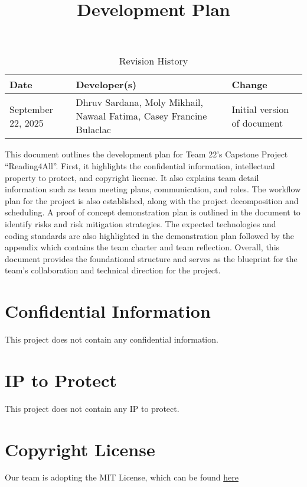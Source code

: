 \documentclass{article}
\title{Development Plan\\\progname}
\author{\authname}
\date{}
\begin{document}
\maketitle

\begin{table}[hp]
\caption{Revision History} \label{TblRevisionHistory}
\begin{tabularx}{\textwidth}{lXl}
\toprule
\textbf{Date} & \textbf{Developer(s)} & \textbf{Change}\\
\midrule
September 22, 2025 & Dhruv Sardana, Moly Mikhail, Nawaal Fatima, Casey Francine Bulaclac & Initial version of document\\
\bottomrule
\end{tabularx}
\end{table}

\newpage{}

This document outlines the development plan for Team 22's Capstone Project ``Reading4All''. First, it highlights the confidential information, intellectual property to protect, and copyright 
license. It also explains team detail information such as team meeting plans, communication,
and roles. The workflow plan for the project is also established, along with the project 
decomposition and scheduling. A proof of concept demonstration plan is outlined in the document to 
identify risks and risk mitigation strategies. The expected technologies and coding standards are 
also highlighted in the demonstration plan followed by the appendix which contains the 
team charter and team reflection. Overall, this document provides the foundational structure 
and serves as the blueprint for the team's collaboration and technical direction for the project.

\section{Confidential Information}

This project does not contain any confidential information.


\section{IP to Protect}
This project does not contain any IP to protect. 
\section{Copyright License}

Our team is adopting the MIT License, which can be found \href{https://github.com/4G06-CAPSTONE-2025/Reading4All/blob/main/LICENSE} {here}
\end{document}
